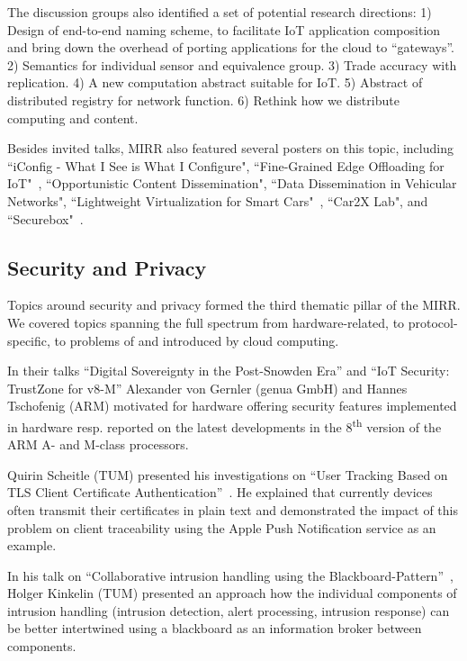 The discussion groups also identified a set of potential
research directions: 1) Design of end-to-end naming scheme, to facilitate IoT
application composition and bring down the overhead of porting applications
for the cloud to ``gateways''. 2) Semantics for individual sensor and
equivalence group. 3) Trade accuracy with replication. 4) A new computation
abstract suitable for IoT. 5) Abstract of distributed registry for network
function. 6) Rethink how we distribute computing and content.

Besides invited talks, MIRR also featured several posters on this topic, including
``iConfig - What I See is What I Configure",
``Fine-Grained Edge Offloading for IoT"~\cite{cozzolino:hotconnet:2017},
``Opportunistic Content Dissemination",
``Data Dissemination in Vehicular Networks",
``Lightweight Virtualization for Smart Cars"~\cite{rmorabito:im:2017},
``Car2X Lab", and ``Securebox"~\cite{hafeez:can:2016}.


\subsection{Security and Privacy}

Topics around security and privacy formed the third thematic pillar of the MIRR. We covered topics spanning the full spectrum from hardware-related, to protocol-specific, to problems of and introduced by cloud computing.


In their talks
``Digital Sovereignty in the Post-Snowden Era'' and
``IoT Security: TrustZone for v8-M'' Alexander von Gernler (genua GmbH) and Hannes Tschofenig (ARM) motivated for hardware offering security features implemented in hardware resp. reported on the latest developments in the 8\textsuperscript{th} version of the ARM A- and M-class processors.

Quirin Scheitle (TUM) presented his investigations on ``User Tracking Based on TLS Client Certificate Authentication''~\cite{qscheitle:tma:2017}. He explained that currently devices often transmit their certificates in plain text and demonstrated the impact of this problem on client traceability using the Apple Push Notification service  as an example.

In his talk on ``Collaborative intrusion handling using the Blackboard-Pattern''~\cite{herold:iscs:2016}, Holger Kinkelin (TUM) presented an approach how the individual components of intrusion handling (intrusion detection, alert processing, intrusion response) can be better intertwined using a blackboard as an information broker between components.

